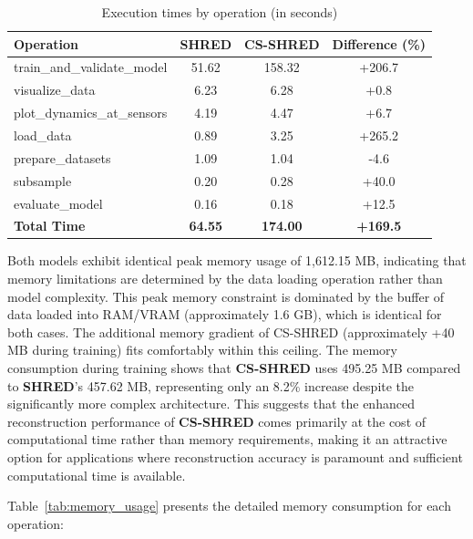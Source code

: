 \begin{table}[h]
\centering
\caption{Execution times by operation (in seconds)}
\label{tab:execution_times}
\begin{tabular}{|l|c|c|c|}
\hline
\textbf{Operation} & \textbf{SHRED} & \textbf{CS-SHRED} & \textbf{Difference (\%)} \\
\hline
train\_and\_validate\_model & 51.62 & 158.32 & +206.7 \\
visualize\_data & 6.23 & 6.28 & +0.8 \\
plot\_dynamics\_at\_sensors & 4.19 & 4.47 & +6.7 \\
load\_data & 0.89 & 3.25 & +265.2 \\
prepare\_datasets & 1.09 & 1.04 & -4.6 \\
subsample & 0.20 & 0.28 & +40.0 \\
evaluate\_model & 0.16 & 0.18 & +12.5 \\
\hline
\textbf{Total Time} & \textbf{64.55} & \textbf{174.00} & \textbf{+169.5} \\
\hline
\end{tabular}
\end{table}

Both models exhibit identical peak memory usage of 1,612.15 MB, indicating that memory limitations are determined by the data loading operation rather than model complexity. This peak memory constraint is dominated by the buffer of data loaded into RAM/VRAM (approximately 1.6 GB), which is identical for both cases. The additional memory gradient of CS-SHRED (approximately +40 MB during training) fits comfortably within this ceiling. The memory consumption during training shows that \textbf{CS-SHRED} uses 495.25 MB compared to \textbf{SHRED}'s 457.62 MB, representing only an 8.2\% increase despite the significantly more complex architecture. This suggests that the enhanced reconstruction performance of \textbf{CS-SHRED} comes primarily at the cost of computational time rather than memory requirements, making it an attractive option for applications where reconstruction accuracy is paramount and sufficient computational time is available.

Table~\ref{tab:memory_usage} presents the detailed memory consumption for each operation:

